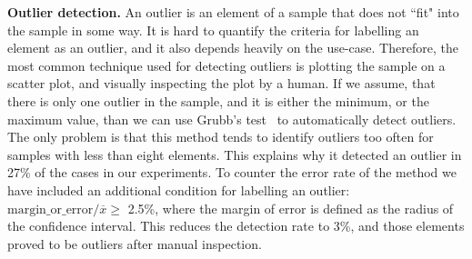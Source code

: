 \documentclass{sig-alternate}
\begin{document}
\noindent\textbf{Outlier detection.}
An outlier is an element of a sample that does not ``fit" into the sample in some way. It is hard to quantify the criteria for labelling an element as an outlier, and it also depends heavily on the use-case. Therefore, the most common technique used for detecting outliers is plotting the sample on a scatter plot, and visually inspecting the plot by a human.
If we assume, that there is only one outlier in the sample, and it is either the minimum, or the maximum value, than we can use Grubb's test~\cite{grubbs1950sample} to automatically detect outliers. The only problem is that this method tends to identify outliers too often for samples with less than eight elements. This explains why it detected an outlier in 27\% of the cases in our experiments. To counter the error rate of the method we have included an additional condition for labelling an outlier: $\text{margin\_or\_error} / \overline{x} \geq$ 2.5\%, where the margin of error is defined as the radius of the confidence interval. This reduces the detection rate to 3\%, and those elements proved to be outliers after manual inspection.
\end{document}

